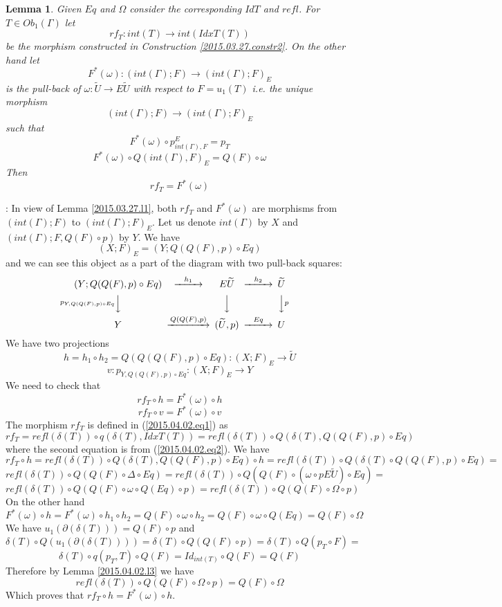 \documentclass[12pt]{article}
\newenvironment{myproof}{{\bf Proof}:}{\vskip 5mm }
\newtheorem{lemma}[proposition]{Lemma}
\newcommand{\llabel}[1]{\label{#1}}
\newcommand{\sr}{\rightarrow}
\newcommand{\wt}{\widetilde}
\begin{document}
\begin{lemma}
\llabel{2015.03.31.l2}
Given $Eq$ and $\Omega$ consider the corresponding $IdT$ and $refl$. For $T\in Ob_1(\Gamma)$ let %
$$rf_T:int(T)\sr int(IdxT(T))$$
%
be the morphism constructed in Construction \ref{2015.03.27.constr2}. On the other hand let 
%
$$F^*(\omega):(int(\Gamma);F)\sr (int(\Gamma);F)_{E}$$
%
is the pull-back of $\omega:\wt{U}\sr E\wt{U}$ with respect to $F=u_1(T)$ i.e. the unique morphism 
%
$$(int(\Gamma);F)\sr (int(\Gamma);F)_{E}$$
%
such that 
%
$$F^*(\omega)\circ p^{E}_{int(\Gamma),F}=p_{T}$$
$$F^*(\omega)\circ Q(int(\Gamma),F)_{E}=Q(F)\circ \omega$$
%
Then 
%
$$rf_T=F^*(\omega)$$
%
\end{lemma}
%
\begin{myproof}
In view of Lemma \ref{2015.03.27.l1}, both $rf_T$ and $F^*(\omega)$ are morphisms from $(int(\Gamma);F)$ to $(int(\Gamma);F)_{E}$. Let us denote $int(\Gamma)$ by $X$ and $(int(\Gamma);F,Q(F)\circ p)$ by $Y$. We have
%
$$(X;F)_{E}=(Y;Q(Q(F),p)\circ Eq)$$
%
and we can see this object as a part of the diagram with two pull-back squares:
%
$$
\begin{CD}
(Y;Q(Q(F),p)\circ Eq) @>h_1>> E\wt{U} @>h_2>> \wt{U}\\
@Vp_{Y, Q(Q(F),p)\circ Eq}VV @VVV @VVpV\\
Y @>Q(Q(F),p)>> (\wt{U},p) @>Eq>> U
\end{CD}
$$
%
We have two projections
%
$$h=h_1\circ h_2=Q(Q(Q(F),p)\circ Eq):(X;F)_{E}\sr \wt{U}$$
$$v:p_{Y,Q(Q(F),p)\circ Eq}:(X;F)_{E} \sr Y$$
%
We need to check that
%
$$rf_T\circ h=F^*(\omega)\circ h$$
$$rf_T\circ v =F^*(\omega)\circ v$$
%
The morphism $rf_T$ is defined in (\ref{2015.04.02.eq1}) as 
%
$$rf_T=refl(\delta(T))\circ q(\delta(T),IdxT(T))=refl(\delta(T))\circ Q(\delta(T),Q(Q(F),p)\circ Eq)$$
%
where the second equation is from (\ref{2015.04.02.eq2}).
%
We have 
%
$$rf_T\circ h = refl(\delta(T))\circ Q(\delta(T),Q(Q(F),p)\circ Eq)\circ h=refl(\delta(T))\circ Q(\delta(T)\circ Q(Q(F),p)\circ Eq)=$$$$refl(\delta(T))\circ Q(Q(F)\circ \Delta\circ Eq)=refl(\delta(T))\circ Q(Q(F)\circ (\omega\circ pE\wt{U})\circ Eq)=$$
$$refl(\delta(T))\circ Q(Q(F)\circ \omega\circ Q(Eq)\circ p)=refl(\delta(T))\circ Q(Q(F)\circ \Omega\circ p)$$
%
On the other hand
%
$$F^*(\omega)\circ h=F^*(\omega)\circ h_1\circ h_2=Q(F)\circ \omega\circ h_2=Q(F)\circ \omega\circ Q(Eq)=Q(F)\circ \Omega$$
%
We have $u_1(\partial(\delta(T)))=Q(F)\circ p$ and 
%
$$\delta(T)\circ Q(u_1(\partial(\delta(T))))=\delta(T)\circ Q(Q(F)\circ p)= \delta(T)\circ Q(p_T\circ F)=$$
$$\delta(T)\circ q(p_T,T)\circ Q(F)=Id_{int(T)}\circ Q(F)=Q(F)$$
%
Therefore by Lemma \ref{2015.04.02.l3} we have
%
$$refl(\delta(T))\circ Q(Q(F)\circ \Omega\circ p)=Q(F)\circ \Omega$$
%
Which proves that $rf_T\circ h=F^*(\omega)\circ h$. 


\end{myproof}
\end{document}
